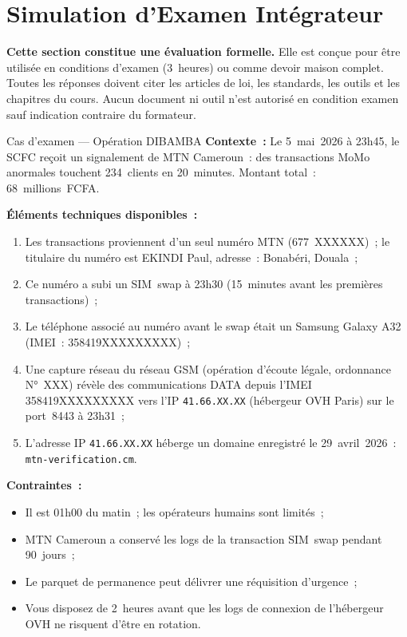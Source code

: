 \section{Simulation d'Examen Intégrateur}
\label{sec:simulation-examen}

\begin{boxalert}
\textbf{Cette section constitue une évaluation formelle.}
Elle est conçue pour être utilisée en conditions d'examen (3~heures)
ou comme devoir maison complet. Toutes les réponses doivent citer
les articles de loi, les standards, les outils et les chapitres
du cours. Aucun document ni outil n'est autorisé en condition examen
sauf indication contraire du formateur.
\end{boxalert}

\begin{boxscenario}{Cas d'examen --- Opération DIBAMBA}
\textbf{Contexte~:} Le 5~mai~2026 à 23h45, le SCFC reçoit un
signalement de MTN Cameroun~: des transactions MoMo anormales
touchent 234~clients en 20~minutes. Montant total~: 68~millions~FCFA.

\textbf{Éléments techniques disponibles~:}
\begin{enumerate}
    \item Les transactions proviennent d'un seul numéro MTN
          (677~XXXXXX)~; le titulaire du numéro est EKINDI Paul,
          adresse~: Bonabéri, Douala~;
    \item Ce numéro a subi un SIM~swap à 23h30 (15~minutes avant
          les premières transactions)~;
    \item Le téléphone associé au numéro avant le swap était un
          Samsung Galaxy A32 (IMEI~: 358419XXXXXXXXX)~;
    \item Une capture réseau du réseau GSM (opération d'écoute
          légale, ordonnance N°~XXX) révèle des communications
          DATA depuis l'IMEI 358419XXXXXXXXX vers l'IP
          \texttt{41.66.XX.XX} (hébergeur OVH Paris) sur le
          port~8443 à 23h31~;
    \item L'adresse IP \texttt{41.66.XX.XX} héberge un domaine
          enregistré le 29~avril~2026~: \texttt{mtn-verification.cm}.
\end{enumerate}

\textbf{Contraintes~:}
\begin{itemize}
    \item Il est 01h00 du matin~; les opérateurs humains sont limités~;
    \item MTN Cameroun a conservé les logs de la transaction
          SIM~swap pendant 90~jours~;
    \item Le parquet de permanence peut délivrer une réquisition
          d'urgence~;
    \item Vous disposez de 2~heures avant que les logs de connexion
          de l'hébergeur OVH ne risquent d'être en rotation.
\end{itemize}
\end{boxscenario}

